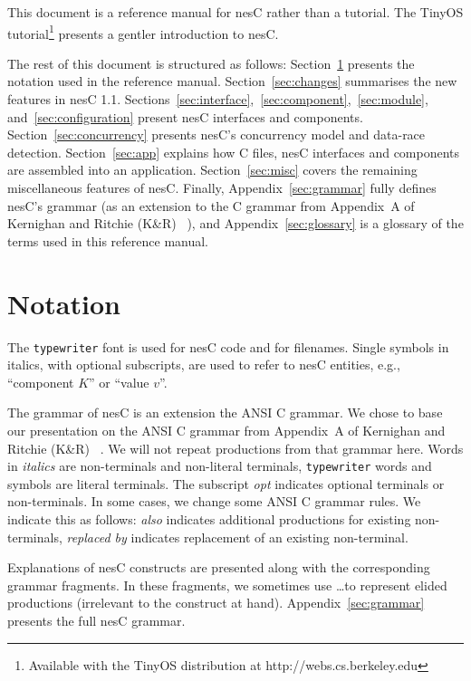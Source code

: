 \documentclass[11pt,letterpaper]{article}
\newcommand{\kw}[1]{{\tt #1}}
\newcommand{\nesc}{nesC\xspace}
\newcommand{\tinyos}{TinyOS\xspace}
\begin{document}
This document is a reference manual for \nesc rather than a tutorial. The
\tinyos tutorial\footnote{Available with the \tinyos distribution at
http://webs.cs.berkeley.edu} presents a gentler introduction to \nesc.

The rest of this document is structured as follows:
Section~\ref{sec:notation} presents the notation used in the reference
manual. Section~\ref{sec:changes} summarises the new features in \nesc
1.1. Sections~\ref{sec:interface},~\ref{sec:component},~\ref{sec:module},
and~\ref{sec:configuration} present \nesc interfaces and
components. Section~\ref{sec:concurrency} presents \nesc's concurrency
model and data-race detection. Section~\ref{sec:app} explains how C files,
\nesc interfaces and components are assembled into an
application. Section~\ref{sec:misc} covers the remaining miscellaneous
features of \nesc. Finally, Appendix~\ref{sec:grammar} fully defines
\nesc's grammar (as an extension to the C grammar from Appendix~A of
Kernighan and Ritchie (K\&R) ~\cite[pp234--239]{kandr}), and
Appendix~\ref{sec:glossary} is a glossary of the terms used in this
reference manual.

\section{Notation}
\label{sec:notation}

The \texttt{typewriter} font is used for \nesc code and for
filenames. Single symbols in italics, with optional subscripts, are used to
refer to \nesc entities, e.g., ``component $K$'' or ``value $v$''.

The grammar of \nesc is an extension the ANSI C grammar. We chose to base
our presentation on the ANSI C grammar from Appendix~A of Kernighan and
Ritchie (K\&R) ~\cite[pp234--239]{kandr}. We will not repeat productions
from that grammar here. Words in \emph{italics} are non-terminals and
non-literal terminals, \kw{typewriter} words and symbols are literal
terminals. The subscript \emph{opt} indicates optional terminals or
non-terminals. In some cases, we change some ANSI C grammar rules. We
indicate this as follows: \emph{also} indicates additional productions for
existing non-terminals, \emph{replaced by} indicates replacement of an
existing non-terminal. 

Explanations of \nesc constructs are presented along with the corresponding
grammar fragments. In these fragments, we sometimes use \ldots to represent
elided productions (irrelevant to the construct at
hand). Appendix~\ref{sec:grammar} presents the full \nesc grammar.
\end{document}
